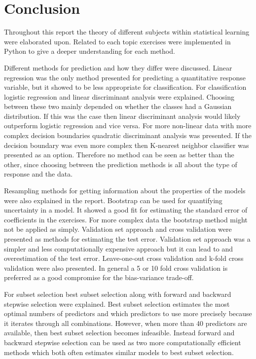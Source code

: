 \chapter{Conclusion}
\label{chp:conc}

Throughout this report the theory of different subjects within statistical learning were elaborated upon. Related to each topic exercises were implemented in Python to give a deeper understanding for each method. 

Different methods for prediction and how they differ were discussed. Linear regression was the only method presented for predicting a quantitative response variable, but it showed to be less appropriate for classification. For classification logistic regression and linear discriminant analysis were explained. Choosing between these two mainly depended on whether the classes had a Gaussian distribution. If this was the case then linear discriminant analysis would likely outperform logistic regression and vice versa. For more non-linear data with more complex decision boundaries quadratic discriminant analysis was presented. If the decision boundary was even more complex then K-nearest neighbor classifier was presented as an option. Therefore no method can be seen as better than the other, since choosing between the prediction methods is all about the type of response and the data.

Resampling methods for getting information about the properties of the models were also explained in the report. Bootstrap can be used for quantifying uncertainty in a model. It showed a good fit for estimating the standard error of coefficients in the exercises. For more complex data the bootstrap method might not be applied as simply.
Validation set approach and cross validation were presented as methods for estimating the test error. Validation set approach was a simpler and less computationally expensive approach but it can lead to and overestimation of the test error. Leave-one-out cross validation and k-fold cross validation were also presented. In general a 5 or 10 fold cross validation is preferred as a good compromise for the bias-variance trade-off.

For subset selection best subset selection along with forward and backward stepwise selection were explained. Best subset selection estimates the most optimal numbers of predictors and which predictors to use more precisely because it iterates through all combinations. However, when more than 40 predictors are available, then best subset selection becomes infeasible. Instead forward and backward stepwise selection can be used as two more computationally efficient methods which both often estimates similar models to best subset selection. 


